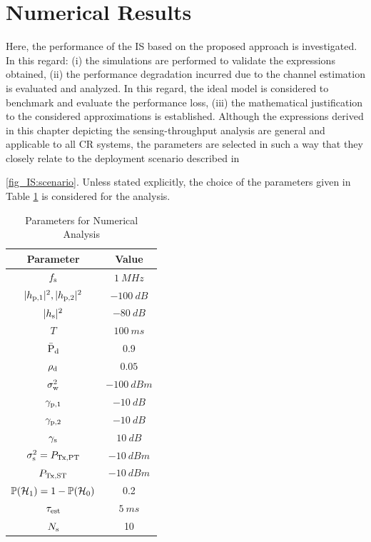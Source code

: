 \section{Numerical Results} \label{sec:num_ana}
Here, the performance of the IS based on the proposed approach is investigated. In this regard: (i) the simulations are performed to validate the expressions obtained, (ii) the performance degradation incurred due to the channel estimation is evaluated and analyzed. In this regard, the ideal model is considered to benchmark and evaluate the performance loss, (iii) the mathematical justification to the considered approximations is established. Although the expressions derived in this chapter depicting the sensing-throughput analysis are general and applicable to all CR systems, the parameters are selected in such a way that they closely relate to the deployment scenario described in \figurename~{\ref{fig_IS:scenario}. Unless stated explicitly, the choice of the parameters given in Table \ref{tb:tb2} is considered for the analysis. 
\begin{table}
\renewcommand{\arraystretch}{1.4}
\caption{Parameters for Numerical Analysis}
\label{tb:tb2}
\centering
\begin{tabular}{c||c}
\hline
\bfseries Parameter & \bfseries Value \\
\hline\hline
$f_{\text{s}}$  & $\SI{1}{MHz}$ \\ %
$|h_{\text{p,1}}|^2, |h_{\text{p,2}}|^2$ & $\SI{-100}{dB}$ \\ %
$|h_{\text{s}}|^2$ & $\SI{-80}{dB}$ \\ %
$T$ & $\SI{100}{ms}$ \\ %
$\bar{\text{P}}_{\text{d}}$ & 0.9 \\ %
$\rho_{\text{d}}$ & $0.05$ \\ %
$\sigma^2_{\text{w}}$ & $\SI{-100}{dBm}$ \\ %
${\gamma}_{\text{p,1}}$ & $\SI{-10}{dB}$ \\ %
${\gamma}_{\text{p,2}}$ & $\SI{-10}{dB}$ \\ %
${\gamma}_{\text{s}}$ & $\SI{10}{dB}$ \\ %
$\sigma^2_{\text{s}} = P_{\text{Tx,PT}}$ & $-\SI{10}{dBm}$ \\ %
$P_{\text{Tx,ST}}$ & $-\SI{10}{dBm}$ \\ %
$\mathbb P(\mathcal{H}_1) = 1 - \mathbb P(\mathcal{H}_0)$ & 0.2 \\ %
$\tau_{\text{est}}$ & $\SI{5}{ms}$ \\ %
$N_{\text{s}}$ & 10 \\ \hline 
\end{tabular}
\end{table}
}
